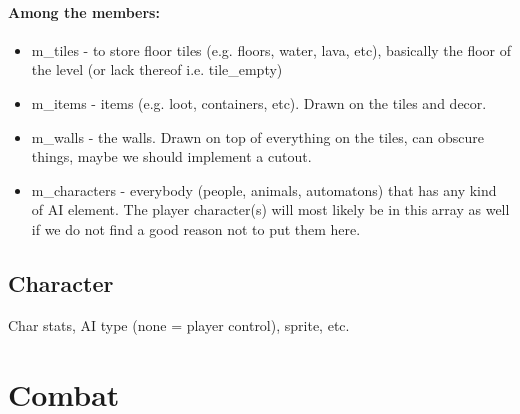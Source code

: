 \documentclass[a4paper,10pt]{book}
\begin{document}
\subsubsection*{Among the members:}
\begin{itemize}
  \item m\_tiles - to store floor tiles (e.g. floors, water, lava, etc),
    basically the floor of the level (or lack thereof i.e. tile\_empty)
  \item m\_items - items (e.g. loot, containers, etc). Drawn on the tiles and decor.
  \item m\_walls - the walls. Drawn on top of everything on the tiles, can
    obscure things, maybe we should implement a cutout.
  \item m\_characters - everybody (people, animals, automatons) that has any
    kind of AI element. The player character(s) will most likely be in this array
    as well if we do not find a good reason not to put them here.
\end{itemize}
\section{\enginenamespace{}Character}
Char stats, AI type (none = player control), sprite, etc.
\TODO{}
\chapter{Combat}
\end{document}
